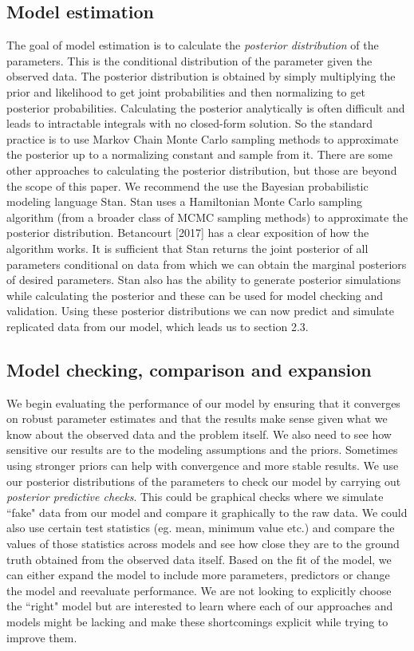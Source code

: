 \documentclass{article}
\begin{document}
\subsection{Model estimation}
The goal of model estimation is to calculate the \textit{posterior distribution} of the parameters. This is the conditional distribution of the parameter given the observed data. The posterior distribution is obtained by simply multiplying the prior and likelihood to get joint probabilities and then normalizing to get posterior probabilities. Calculating the posterior analytically is often difficult and leads to intractable integrals with no closed-form solution. So the standard practice is to use Markov Chain Monte Carlo sampling methods to approximate the posterior up to a normalizing constant and sample from it. There are some other approaches to calculating the posterior distribution, but those are beyond the scope of this paper. We recommend the use the Bayesian probabilistic modeling language Stan. Stan uses a Hamiltonian Monte Carlo sampling algorithm (from a broader class of MCMC sampling methods) to approximate the posterior distribution. Betancourt [2017] has a clear exposition of how the algorithm works. It is sufficient that Stan returns the joint posterior of all parameters conditional on data from which we can obtain the marginal posteriors of desired parameters. Stan also has the ability to generate posterior simulations while calculating the posterior and these can be used for model checking and validation. Using these posterior distributions we can now predict and simulate replicated data from our model, which leads us to section 2.3. 
\subsection{Model checking, comparison and expansion}
We begin evaluating the performance of our model by ensuring that it converges on robust parameter estimates and that the results make sense given what we know about the observed data and the problem itself. We also need to see how sensitive our results are to the modeling assumptions and the priors. Sometimes using stronger priors can help with convergence and more stable results. We use our posterior distributions of the parameters to check our model by carrying out \textit{posterior predictive checks}. This could be graphical checks where we simulate ``fake" data from our model and compare it graphically to the raw data. We could also use certain test statistics (eg. mean, minimum value etc.) and compare the values of those statistics across models and see how close they are to the ground truth obtained from the observed data itself. Based on the fit of the model, we can either expand the model to include more parameters, predictors or change the model and reevaluate performance. We are not looking to explicitly choose the ``right" model but are interested to learn where each of our approaches and models might be lacking and make these shortcomings explicit while trying to improve them.
\end{document}
